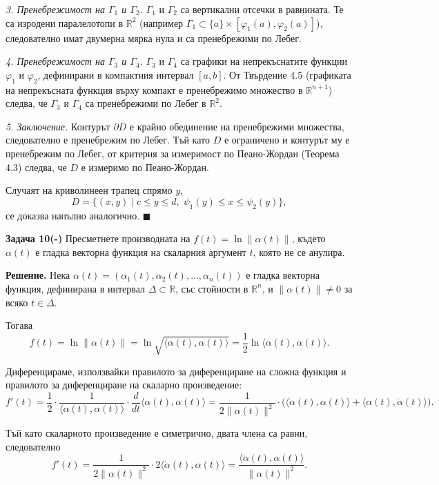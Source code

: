 \documentclass[10pt]{article}
\begin{document}
\textit{3. Пренебрежимост на $\Gamma_1$ и $\Gamma_2$.} 
$\Gamma_1$ и $\Gamma_2$ са вертикални отсечки в равнината. Те са изродени паралелотопи в $\mathbb{R}^2$ (например $\Gamma_1 \subset \{a\} \times [\varphi_1(a),\varphi_2(a)]$), следователно имат двумерна мярка нула и са пренебрежими по Лебег.

\textit{4. Пренебрежимост на $\Gamma_3$ и $\Gamma_4$.} 
$\Gamma_3$ и $\Gamma_4$ са графики на непрекъснатите функции $\varphi_1$ и $\varphi_2$, дефинирани в компактния интервал $[a,b]$. От Твърдение 4.5 (графиката на непрекъсната функция върху компакт е пренебрежимо множество в $\mathbb{R}^{n+1}$) следва, че $\Gamma_3$ и $\Gamma_4$ са пренебрежими по Лебег в $\mathbb{R}^2$.

\textit{5. Заключение.} 
Контурът $\partial D$ е крайно обединение на пренебрежими множества, следователно е пренебрежим по Лебег. Тъй като $D$ е ограничено и контурът му е пренебрежим по Лебег, от критерия за измеримост по Пеано-Жордан (Теорема 4.3) следва, че $D$ е измеримо по Пеано-Жордан.

Случаят на криволинеен трапец спрямо $y$,
\[
D = \{(x,y) \mid c \le y \le d,\; \psi_1(y) \le x \le \psi_2(y)\},
\]
се доказва напълно аналогично. $\blacksquare$


\textbf{Задача 10(-) }Пресметнете производната на $f(t) = \ln\|\alpha(t)\|$, където $\alpha(t)$ е гладка векторна функция на скаларния аргумент $t$, която не се анулира.

\textbf{Решение.} 
Нека $\alpha(t) = (\alpha_1(t),\alpha_2(t),\dots,\alpha_n(t))$ е гладка векторна функция, дефинирана в интервал $\Delta \subset \mathbb{R}$, със стойности в $\mathbb{R}^n$, и $\|\alpha(t)\| \neq 0$ за всяко $t \in \Delta$.

Тогава
\[
f(t) = \ln\|\alpha(t)\| = \ln\sqrt{\langle \alpha(t),\alpha(t)\rangle} = \frac12 \ln\langle \alpha(t),\alpha(t)\rangle.
\]

Диференцираме, използвайки правилото за диференциране на сложна функция и правилото за диференциране на скаларно произведение:
\[
f'(t) = \frac12 \cdot \frac{1}{\langle \alpha(t),\alpha(t)\rangle} \cdot \frac{d}{dt}\langle \alpha(t),\alpha(t)\rangle = \frac{1}{2\|\alpha(t)\|^2} \cdot \bigl( \langle \dot\alpha(t),\alpha(t)\rangle + \langle \alpha(t),\dot\alpha(t)\rangle \bigr).
\]

Тъй като скаларното произведение е симетрично, двата члена са равни, следователно
\[
f'(t) = \frac{1}{2\|\alpha(t)\|^2} \cdot 2\langle \dot\alpha(t),\alpha(t)\rangle = \frac{\langle \dot\alpha(t),\alpha(t)\rangle}{\|\alpha(t)\|^2}.
\]
\end{document}
